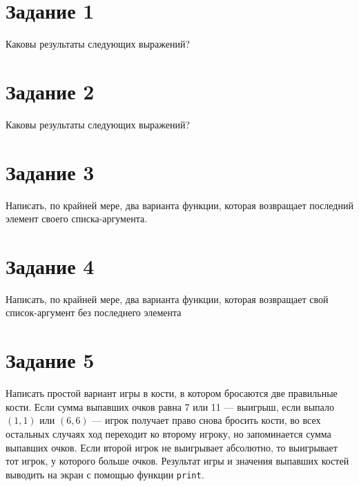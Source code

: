 \section*{Задание 1}

Каковы результаты следующих выражений?



\section*{Задание 2}

Каковы результаты следующих выражений?



\section*{Задание 3}

Написать, по крайней мере, два варианта функции, которая возвращает последний элемент своего списка-аргумента.



\section*{Задание 4}

Написать, по крайней мере, два варианта функции, которая возвращает свой список-аргумент без последнего элемента




\section*{Задание 5}
 Написать простой вариант игры в кости, в котором бросаются две правильные кости. Если сумма выпавших очков равна 7 или 11 --- выигрыш, если выпало $(1, 1)$ или $(6, 6)$ --- игрок получает право снова бросить кости, во всех остальных случаях ход переходит ко второму игроку, но запоминается сумма выпавших очков. Если второй игрок не выигрывает абсолютно, то выигрывает тот игрок, у которого больше очков. Результат игры и значения выпавших костей выводить на экран с помощью функции \texttt{print}.

